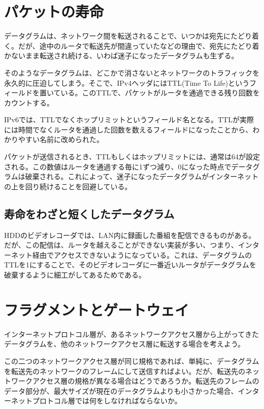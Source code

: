 \section{パケットの寿命}

データグラムは、ネットワーク間を転送されることで、いつかは宛先にたどり着く。だが、途中のルータで転送先が間違っていたなどの理由で、宛先にたどり着かないまま転送され続ける、いわば迷子になったデータグラムも生ずる。

そのようなデータグラムは、どこかで消さないとネットワークのトラフィックを永久的に圧迫してしまう。そこで、IPv4ヘッダにはTTL(Time To Life)というフィールドを置いている。このTTLで、パケットがルータを通過できる残り回数をカウントする。

IPv6では、TTLでなくホップリミットというフィールド名となる。TTLが実際には時間でなくルータを通過した回数を数えるフィールドになったことから、わかりやすい名前に改められた。

パケットが送信されるとき、TTLもしくはホップリミットには、通常は64が設定される。この数値はルータを通過する毎に1ずつ減り、0になった時点でデータグラムは破棄される。これによって、迷子になったデータグラムがインターネットの上を回り続けることを回避している。

\subsection{寿命をわざと短くしたデータグラム}

HDDのビデオレコーダでは、LAN内に録画した番組を配信できるものがある。だが、この配信は、ルータを越えることができない実装が多い、つまり、インターネット経由でアクセスできないようになっている。これは、データグラムのTTLを1にすることで、そのビデオレコーダに一番近いルータがデータグラムを破棄するように細工がしてあるためである。

\section{フラグメントとゲートウェイ}

インターネットプロトコル層が、あるネットワークアクセス層から上がってきたデータグラムを、他のネットワークアクセス層に転送する場合を考えよう。

この二つのネットワークアクセス層が同じ規格であれば、単純に、データグラムを転送先のネットワークのフレームにして送信すればよい。だが、転送先のネットワークアクセス層の規格が異なる場合はどうであろうか。転送先のフレームのデータ部分が、最大サイズが現在のデータグラムよりも小さかった場合、インターネットプロトコル層では何をしなければならないか。

